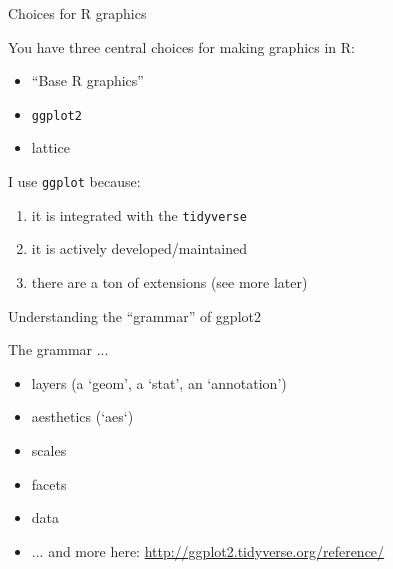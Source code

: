 \documentclass[table]{beamer}\usepackage[]{graphicx}\usepackage[]{xcolor}
\begin{document}

\begin{frame}{Choices for R graphics}

You have three central choices for making graphics in R:

\begin{itemize}
    \item ``Base R graphics''
    \item {\tt ggplot2}
    \item lattice
\end{itemize}

\vspace{2em}

I use {\tt ggplot} because:
\begin{enumerate}
    \item it is integrated with the {\tt tidyverse}
    \item it is actively developed/maintained
    \item there are a ton of extensions (see more later)
\end{enumerate}


\end{frame}



\begin{frame}[fragile]{Understanding the ``grammar'' of ggplot2}

The grammar ...

\begin{itemize}
    \item layers (a `geom', a `stat', an `annotation')
    \item aesthetics (`aes`)
    \item scales
    \item facets
    \item data
    \item ... and more here: \href{http://ggplot2.tidyverse.org/reference/}{http://ggplot2.tidyverse.org/reference/}
\end{itemize}

\end{frame}

\end{document}
